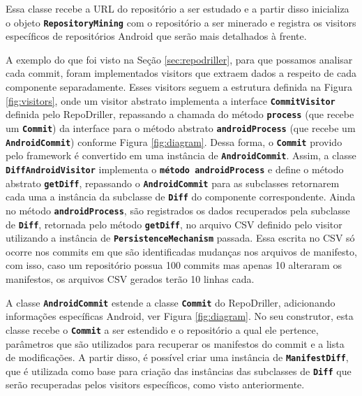 \documentclass[a4paper,12pt]{article}
\begin{document}
{Essa classe recebe a URL do repositório a ser estudado e a partir disso inicializa o objeto {\small\texttt{\textbf{RepositoryMining}}} com o repositório a ser minerado e registra os visitors específicos de repositórios Android que serão mais detalhados à frente.


A exemplo do que foi visto na Seção \ref{sec:repodriller}, para que possamos analisar cada commit, foram implementados visitors que extraem dados a respeito de cada componente separadamente. Esses visitors seguem a estrutura definida na Figura \ref{fig:visitors}, onde um visitor abstrato implementa a interface {\small\texttt{\textbf{CommitVisitor}}} definida pelo RepoDriller, repassando a chamada do método {\small\texttt{\textbf{process}}} (que recebe um {\small\texttt{\textbf{Commit}}}) da interface para o método abstrato {\small\texttt{\textbf{androidProcess}}} (que recebe um {\small\texttt{\textbf{AndroidCommit}}}) conforme Figura \ref{fig:diagram}. Dessa forma, o {\small\texttt{\textbf{Commit}}} provido pelo framework é convertido em uma instância de {\small\texttt{\textbf{AndroidCommit}}}. Assim, a classe {\small\texttt{\textbf{DiffAndroidVisitor}}} implementa o {\small\texttt{\textbf{método androidProcess}}} e define o método abstrato {\small\texttt{\textbf{getDiff}}}, repassando o {\small\texttt{\textbf{AndroidCommit}}} para as subclasses retornarem cada uma a instância da subclasse de {\small\texttt{\textbf{Diff}}} do componente correspondente. Ainda no método {\small\texttt{\textbf{androidProcess}}}, são registrados os dados recuperados pela subclasse de {\small\texttt{\textbf{Diff}}}, retornada pelo método {\small\texttt{\textbf{getDiff}}}, no arquivo CSV definido pelo visitor utilizando a instância de {\small\texttt{\textbf{PersistenceMechanism}}} passada. Essa escrita no CSV só ocorre nos commits em que são identificadas mudanças nos arquivos de manifesto, com isso, caso um repositório possua 100 commits mas apenas 10  alteraram os manifestos, os arquivos CSV gerados terão 10 linhas cada.

A classe {\small\texttt{\textbf{AndroidCommit}}} estende a classe {\small\texttt{\textbf{Commit}}} do RepoDriller, adicionando informações específicas Android, ver Figura \ref{fig:diagram}. No seu construtor, esta classe recebe o {\small\texttt{\textbf{Commit}}} a ser estendido e o repositório a qual ele pertence, parâmetros que são utilizados para recuperar os manifestos do commit e a lista de modificações. A partir disso, é possível criar uma instância de {\small\texttt{\textbf{ManifestDiff}}}, que é utilizada como base para criação das instâncias das subclasses de {\small\texttt{\textbf{Diff}}} que serão recuperadas pelos visitors específicos, como visto anteriormente.


}
\end{document}
